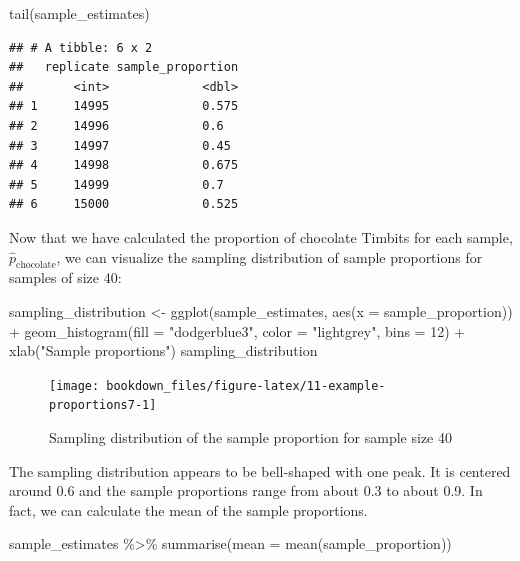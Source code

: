 \documentclass[
]{krantz}
\makeatletter
\newenvironment{Shaded}{\begin{snugshade}}{\end{snugshade}}
\newcommand{\AttributeTok}[1]{\textcolor[rgb]{0.61,0.61,0.61}{#1}}
\newcommand{\DecValTok}[1]{\textcolor[rgb]{0.06,0.06,0.06}{#1}}
\newcommand{\FunctionTok}[1]{\textcolor[rgb]{0,0,0}{#1}}
\newcommand{\NormalTok}[1]{#1}
\newcommand{\OtherTok}[1]{\textcolor[rgb]{0.37,0.37,0.37}{#1}}
\newcommand{\SpecialCharTok}[1]{\textcolor[rgb]{0,0,0}{#1}}
\newcommand{\StringTok}[1]{\textcolor[rgb]{0.5,0.5,0.5}{#1}}
\newenvironment{kframe}{%
\medskip{}
\setlength{\fboxsep}{.8em}
 \def\at@end@of@kframe{}%
 \ifinner\ifhmode%
  \def\at@end@of@kframe{\end{minipage}}%
  \begin{minipage}{\columnwidth}%
 \fi\fi%
 \def\FrameCommand##1{\hskip\@totalleftmargin \hskip-\fboxsep
 \colorbox{shadecolor}{##1}\hskip-\fboxsep
     \hskip-\linewidth \hskip-\@totalleftmargin \hskip\columnwidth}%
 \MakeFramed {\advance\hsize-\width
   \@totalleftmargin\z@ \linewidth\hsize
   \@setminipage}}%
 {\par\unskip\endMakeFramed%
 \at@end@of@kframe}
\renewenvironment{Shaded}{\begin{kframe}}{\end{kframe}}
\makeatother
\begin{document}
\begin{Shaded}
\begin{Highlighting}[]
\FunctionTok{tail}\NormalTok{(sample\_estimates)}
\end{Highlighting}
\end{Shaded}

\begin{verbatim}
## # A tibble: 6 x 2
##   replicate sample_proportion
##       <int>             <dbl>
## 1     14995             0.575
## 2     14996             0.6  
## 3     14997             0.45 
## 4     14998             0.675
## 5     14999             0.7  
## 6     15000             0.525
\end{verbatim}

Now that we have calculated the proportion of chocolate Timbits for each sample, \(\hat{p}_\text{chocolate}\), we can visualize the sampling distribution of sample proportions for samples of size 40:

\begin{Shaded}
\begin{Highlighting}[]
\NormalTok{sampling\_distribution }\OtherTok{\textless{}{-}} \FunctionTok{ggplot}\NormalTok{(sample\_estimates, }\FunctionTok{aes}\NormalTok{(}\AttributeTok{x =}\NormalTok{ sample\_proportion)) }\SpecialCharTok{+}
  \FunctionTok{geom\_histogram}\NormalTok{(}\AttributeTok{fill =} \StringTok{"dodgerblue3"}\NormalTok{, }\AttributeTok{color =} \StringTok{"lightgrey"}\NormalTok{, }\AttributeTok{bins =} \DecValTok{12}\NormalTok{) }\SpecialCharTok{+}
  \FunctionTok{xlab}\NormalTok{(}\StringTok{"Sample proportions"}\NormalTok{)}
\NormalTok{sampling\_distribution}
\end{Highlighting}
\end{Shaded}

\begin{figure}
\texttt{[image: bookdown\_files/figure-latex/11-example-proportions7-1]} \caption{Sampling distribution of the sample proportion for sample size 40}\label{fig:11-example-proportions7}
\end{figure}

The sampling distribution appears to be bell-shaped with one peak. It is
centered around 0.6 and the
sample proportions range from about 0.3 to
about 0.9. In fact, we can calculate
the mean of the sample proportions.

\begin{Shaded}
\begin{Highlighting}[]
\NormalTok{sample\_estimates }\SpecialCharTok{\%\textgreater{}\%}
  \FunctionTok{summarise}\NormalTok{(}\AttributeTok{mean =} \FunctionTok{mean}\NormalTok{(sample\_proportion))}
\end{Highlighting}
\end{Shaded}
\end{document}
